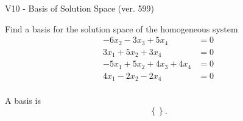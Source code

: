 \begin{exercise}
  \begin{exerciseTitle}V10 - Basis of Solution Space (ver. 599)\end{exerciseTitle}
  \begin{exerciseStatement}
    Find a basis for the solution space of the homogeneous system 
\begin{align*}
 -6 x_ 2 -3 x_ 3 + 5 x_ 4 &= 0  \\ 
  3 x_ 1 + 5 x_ 2 + 3 x_ 4 &= 0  \\ 
  -5 x_ 1 + 5 x_ 2 + 4 x_ 3 + 4 x_ 4 &= 0  \\ 
  4 x_ 1 -2 x_ 2 -2 x_ 4 &= 0  \\ 
 \end{align*}


 
  \end{exerciseStatement}

  \begin{exerciseAnswer}
   A basis is   
\[\left\{\right\}.\]

  


  \end{exerciseAnswer}
\end{exercise}